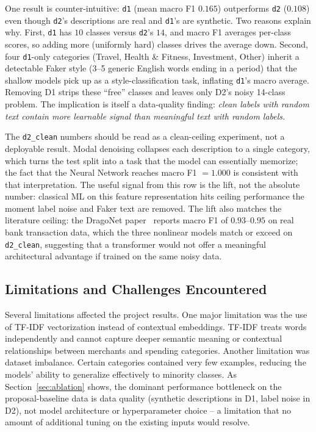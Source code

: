 \documentclass[11pt]{article}
\begin{document}
One result is counter-intuitive: \texttt{d1} (mean macro F1 $0.165$)
outperforms \texttt{d2} ($0.108$) even though \texttt{d2}'s descriptions
are real and \texttt{d1}'s are synthetic. Two reasons explain why. First, \texttt{d1} has $10$ classes versus \texttt{d2}'s
$14$, and macro F1 averages per-class scores, so adding more (uniformly
hard) classes drives the average down. Second, four \texttt{d1}-only
categories (Travel, Health \& Fitness, Investment, Other) inherit a
detectable Faker style (3--5 generic English words ending in a period)
that the shallow models pick up as a style-classification task,
inflating \texttt{d1}'s macro average. Removing D1 strips these
``free'' classes and leaves only D2's noisy 14-class problem. The
implication is itself a data-quality finding: \emph{clean labels with
random text contain more learnable signal than meaningful text with
random labels.}

The \texttt{d2\_clean} numbers should be read as a clean-ceiling
experiment, not a deployable result. Modal denoising collapses each
description to a single category, which turns the test split into a
task that the model can essentially memorize; the fact that the Neural
Network reaches macro F1 $= 1.000$ is consistent with that
interpretation. The useful signal from this row is the lift, not the
absolute number: classical ML on this feature representation hits
ceiling performance the moment label noise and Faker text are removed.
The lift also matches the literature ceiling: the DragoNet
paper~\cite{busson2023hierarchical} reports macro F1 of $0.93$--$0.95$
on real bank transaction data, which the three nonlinear models match
or exceed on \texttt{d2\_clean}, suggesting that a transformer would
not offer a meaningful architectural advantage if trained on the same
noisy data.

\subsection{Limitations and Challenges Encountered}
\label{sec:limitations}

Several limitations affected the project results. One major limitation was
the use of TF-IDF vectorization instead of contextual embeddings. TF-IDF
treats words independently and cannot capture deeper semantic meaning or
contextual relationships between merchants and spending categories. Another
limitation was dataset imbalance. Certain categories contained very few
examples, reducing the models' ability to generalize effectively to minority
classes. As Section~\ref{sec:ablation} shows, the dominant performance
bottleneck on the proposal-baseline data is data quality (synthetic
descriptions in D1, label noise in D2), not model architecture or
hyperparameter choice -- a limitation that no amount of additional tuning
on the existing inputs would resolve.
\end{document}
